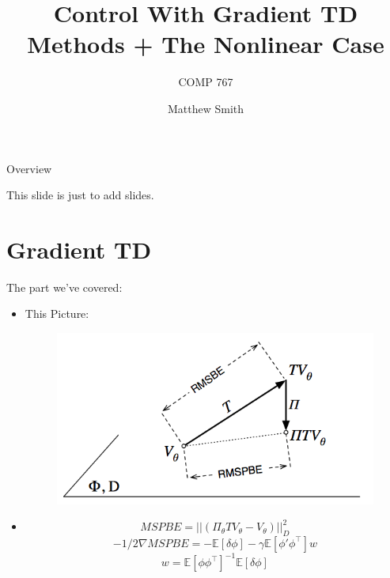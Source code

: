 \documentclass{beamer}
\title{Control With Gradient TD Methods + The Nonlinear Case}
\subtitle{COMP 767}
\author{Matthew Smith}
\date{}
\begin{document}
\begin{frame}
  \titlepage
\end{frame}




\begin{frame}{Overview}

\tableofcontents
This slide is just to add slides.
\end{frame}

\section{Gradient TD}
\begin{frame}{The part we've covered:}

\begin{itemize}
\item This Picture:
  \begin{figure}
  \includegraphics[width=0.8\linewidth]{classic.png}
  \end{figure}
  \item \[MSPBE = ||  (\Pi_\theta TV_\theta - V_\theta)||_D^2\]
   \[-1/2 \nabla MSPBE = - \mathbb{E}[\delta\phi]
- \gamma\mathbb{E}[\phi'\phi^\top ]w
  \]
\[w = \mathbb{E}[\phi\phi^\top]^{-1}\mathbb{E}[\delta\phi]\]
\end{itemize}

\end{frame}
\end{document}
